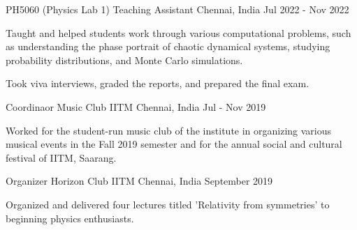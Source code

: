 

\begin{cventries}

\cventry
    {PH5060 (Physics Lab 1)} %
    {Teaching Assistant} %
    {Chennai, India} %
    {Jul 2022 - Nov 2022} %
    {
      \begin{cvitems} %
        \item {Taught and helped students work through various computational problems, such as understanding the phase portrait of chaotic dynamical systems, studying probability distributions, and Monte Carlo simulations.} \item {Took viva interviews, graded the reports, and prepared the final exam.}
      \end{cvitems}
    }

  \cventry
    {Coordinaor} %
    {Music Club IITM} %
    {Chennai, India} %
    {Jul - Nov 2019} %
    {
      \begin{cvitems} %
        \item {Worked for the student-run music club of the institute in organizing various musical events in the Fall 2019 semester and for the annual social and cultural festival of IITM, Saarang.}
      \end{cvitems}
    }


  \cventry
    {Organizer} %
    {Horizon Club IITM} %
    {Chennai, India} %
    {September 2019} %
    {
      \begin{cvitems} %
        \item {Organized and delivered four lectures titled 'Relativity from symmetries' to beginning physics enthusiasts.}
      \end{cvitems}
    }



\end{cventries}

